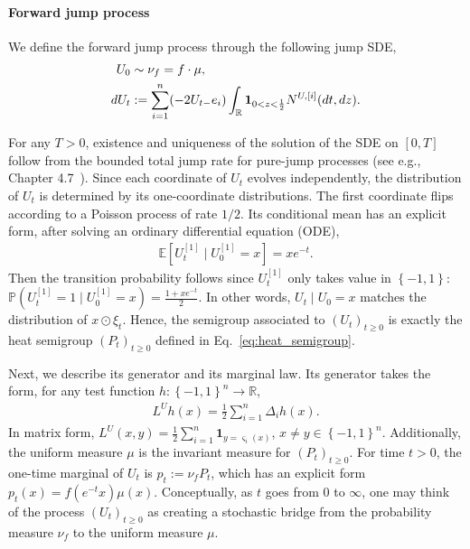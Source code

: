 \documentclass[11pt]{article}
\newcommand{\flip}{\varsigma}
\newcommand{\fU}{U}
\newcommand{\fL}{L^U}
\newcommand{\NUi}{N^{U,[i]}}
\newcommand{\tagone}{{[1]}}
\theoremstyle{named}
\theoremstyle{plain}
\newcommand{\defn}{:=}
\newcommand{\real}{\ensuremath{\mathbb{R}}}
\newcommand{\Exs}{\ensuremath{{\mathbb{E}}}}
\newcommand{\Prob}{\ensuremath{{\mathbb{P}}}}
\newcommand{\brackets}[1]{\left[ #1 \right]}
\newcommand{\braces}[1]{\left\{ #1 \right \}}
\begin{document}
\paragraph{Forward jump process} We define the forward jump process through the following jump SDE,
\begin{align}
  \label{eq:def_forward_process}
  \fU_0 &\sim \nu_f = f \cdot \mu, \notag \\
  d\fU_t &\defn \sum_{i=1}^n (-2 \fU_{t-} e_i) \int_{\real}\mathbf{1}_{0 < z < \frac12} \NUi(dt, dz).
\end{align}

For any $T > 0$, existence and uniqueness of the solution of the SDE on $[0, T]$ follow from the bounded total jump rate for pure-jump processes (see e.g., Chapter 4.7~\cite{ethier2009markov}). Since each coordinate of $\fU_t$ evolves independently, the distribution of $\fU_t$ is determined by its one-coordinate distributions. The first coordinate flips according to a Poisson process of rate $1/2$. Its conditional mean has an explicit form, after solving an ordinary differential equation (ODE), 
\begin{align*}
  \Exs\brackets{\fU_t^\tagone \mid \fU_0^\tagone = x} = x e^{-t}. 
\end{align*}
Then the transition probability follows since $\fU_t^\tagone$ only takes value in $\braces{-1,1}$: $\Prob(\fU_t^\tagone = 1 \mid \fU_0^\tagone = x) = \frac{1+xe^{-t}}{2}$. In other words, $\fU_t \mid \fU_0 = x$ matches the distribution of $x \odot \xi_t$. Hence, the semigroup associated to $(\fU_t)_{t\geq 0}$ is exactly the heat semigroup $(P_t)_{t\geq 0}$ defined in Eq.~\eqref{eq:heat_semigroup}. 

Next, we describe its generator and its marginal law. Its generator takes the form, for any test function $h: \braces{-1,1}^n \to \real$,
\begin{align}
  \label{eq:heat_semigroup_generator}
  \fL h(x) = \frac{1}{2} \sum_{i=1}^n \Delta_i h(x). 
\end{align}
In matrix form, $\fL(x, y) = \frac12 \sum_{i=1}^n \mathbf{1}_{y = \flip_i(x)}$,  $x \neq y \in \braces{-1, 1}^n$. Additionally, the uniform measure $\mu$ is the invariant measure for $(P_t)_{t\geq 0}$. For time $t > 0$, the one-time marginal of $\fU_t$ is $p_t \defn \nu_f P_t$, which has an explicit form $p_t(x) = f(e^{-t} x) \mu(x)$. Conceptually, as $t$ goes from $0$ to $\infty$, one may think of the process $(\fU_t)_{t\geq 0}$ as creating a stochastic bridge from the probability measure $\nu_f$ to the uniform measure $\mu$. 
\end{document}
